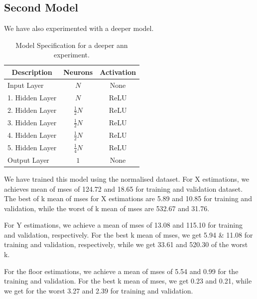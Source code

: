 \subsection{Second Model}
We have also experimented with a deeper model. 
\begin{table}[H]
    \centering
    \caption{Model Specification for a deeper \gls{ann} experiment.}
    \begin{tabular}{m{}m{} m{}}
        \hline
        \multicolumn{1}{c}{\textbf{Description}} & \multicolumn{1}{c}{\textbf{Neurons}} & \multicolumn{1}{c}{\textbf{Activation}}\\
        \hline
        
        Input Layer         &   \multicolumn{1}{c}{$N$} & \multicolumn{1}{c}{None}        \\
        1. Hidden Layer     &   \multicolumn{1}{c}{$N$}  & \multicolumn{1}{c}{ReLU}     \\
        2. Hidden Layer     &   \multicolumn{1}{c}{$\frac{1}{2}N$}  & \multicolumn{1}{c}{ReLU}     \\
        3. Hidden Layer         &   \multicolumn{1}{c}{$\frac{1}{2}N$} & \multicolumn{1}{c}{ReLU}        \\
        4. Hidden Layer         &   \multicolumn{1}{c}{$\frac{1}{2}N$} & \multicolumn{1}{c}{ReLU}        \\
        5. Hidden Layer         &   \multicolumn{1}{c}{$\frac{1}{4}N$} & \multicolumn{1}{c}{ReLU}        \\
        Output Layer     &   \multicolumn{1}{c}{$1$}  & \multicolumn{1}{c}{None}     \\
        \hline
    \end{tabular}
    \label{tab:NN02}
\end{table}
We have trained this model using the normalised dataset. For X estimations, we achieves mean of \gls{mse}s of 124.72 and 18.65 for training and validation dataset. The best of k mean of \gls{mse}s for X estimations are 5.89 and 10.85 for training and validation, while the worst of k mean of \gls{mse}s are 532.67 and 31.76.

For Y estimations, we achieve a mean of \gls{mse}s of 13.08 and 115.10 for training and validation, respectively. For the best k mean of \gls{mse}s, we get 5.94 \& 11.08 for training and validation, respectively, while we get 33.61 and 520.30 of the worst k.

For the floor estimations, we achieve a mean of \gls{mse}s of 5.54 and 0.99 for the training and validation. For the best k mean of \gls{mse}s, we get 0.23 and 0.21, while we get for the worst 3.27 and 2.39 for training and validation.

